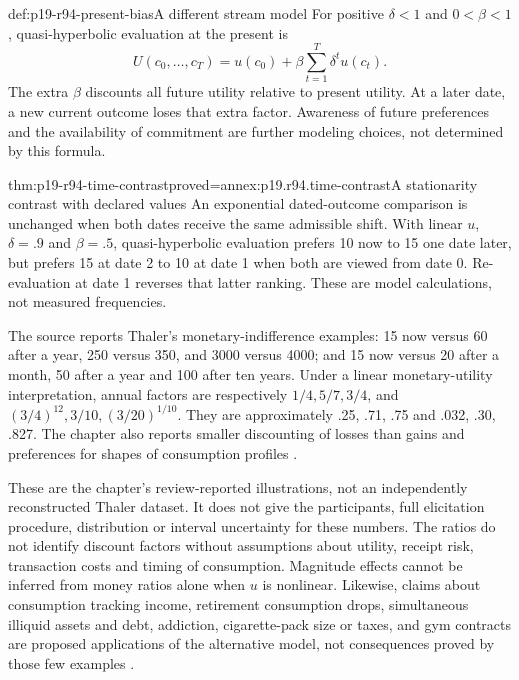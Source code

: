 \begin{hbdefinition}{def:p19-r94-present-bias}{A different stream model}
For positive \(\delta<1\) and \(0<\beta<1\), quasi-hyperbolic
evaluation at the present is
\[
 U(c_0,\ldots,c_T)=u(c_0)+\beta\sum_{t=1}^T\delta^t u(c_t).
\]
The extra \(\beta\) discounts all future utility relative to present
utility. At a later date, a new current outcome loses that extra factor.
Awareness of future preferences and the availability of commitment are
further modeling choices, not determined by this formula.
\end{hbdefinition}

\begin{hbtheorem}{thm:p19-r94-time-contrast}{proved=annex:p19.r94.time-contrast}{A stationarity contrast with declared values}
An exponential dated-outcome comparison is unchanged when both dates
receive the same admissible shift. With linear \(u\), \(\delta=.9\)
and \(\beta=.5\), quasi-hyperbolic evaluation prefers 10 now to
15 one date later, but prefers 15 at date 2 to 10 at date 1 when both
are viewed from date 0. Re-evaluation at date 1 reverses that latter
ranking. These are model calculations, not measured frequencies.
\end{hbtheorem}

The source reports Thaler's monetary-indifference examples: 15 now versus
60 after a year, 250 versus 350, and 3000 versus 4000; and 15 now versus
20 after a month, 50 after a year and 100 after ten years. Under a
linear monetary-utility interpretation, annual factors are respectively
\(1/4,5/7,3/4\), and \((3/4)^{12},3/10,(3/20)^{1/10}\).
They are approximately .25, .71, .75 and .032, .30, .827.
The chapter also reports smaller discounting of losses than gains and
preferences for shapes of consumption profiles
\cite[p.~571]{DhamiAlNowaihi2021Economics}.

These are the chapter's review-reported illustrations, not an independently
reconstructed Thaler dataset. It does not give the participants, full
elicitation procedure, distribution or interval uncertainty for these
numbers. The ratios do not identify discount factors without assumptions
about utility, receipt risk, transaction costs and timing of consumption.
Magnitude effects cannot be inferred from money ratios alone when \(u\)
is nonlinear. Likewise, claims about consumption tracking income,
retirement consumption drops, simultaneous illiquid assets and debt,
addiction, cigarette-pack size or taxes, and gym contracts are proposed
applications of the alternative model, not consequences proved by those
few examples \cite[p.~571, note~7]{DhamiAlNowaihi2021Economics}.

